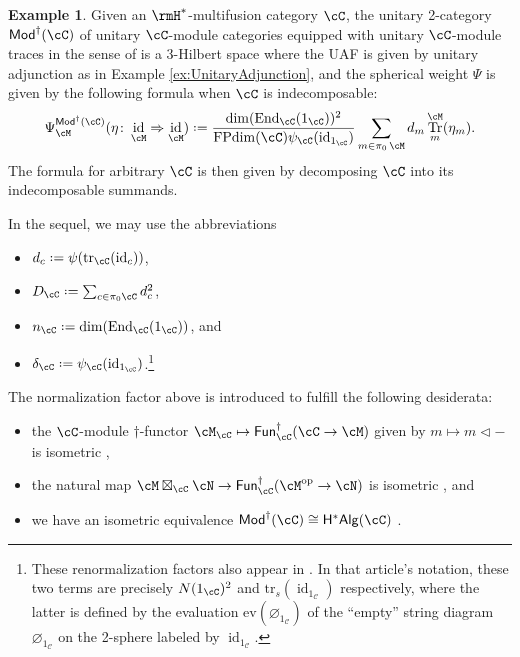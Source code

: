 \documentclass[12pt, reqno]{amsart}
\DeclareMathOperator{\End}{End}
\DeclareMathOperator{\FPdim}{FPdim}
\DeclareMathOperator{\id}{id}
\DeclareMathOperator{\Irr}{\pi_0}
\newcommand{\op}{\mathrm{op}}
\DeclareMathOperator{\Tr}{Tr}
\DeclareMathOperator{\tr}{tr}
\newcommand{\Mod}{\mathsf{Mod}}
\newcommand{\Fun}{\mathsf{Fun}}
\newcommand{\HstarAlg}{\mathsf{H^*Alg}}
\theoremstyle{plain}
\theoremstyle{definition}
\newtheorem{ex}[thm]{Example}
\newcommand{\coloneq}{:=}
\def\coloneq{\mathrel{\vcenter{\baselineskip0.55ex\lineskiplimit0pt\hbox{\upshape.}\hbox{\upshape.}}}=}
\begin{document}
\begin{ex}\label{ex:ModforH*mFC}
Given an $\rmH^*$-multifusion category $\cC$, 
the unitary 2-category
$\Mod^\dag(\cC)$ of unitary $\cC$-module categories equipped with unitary $\cC$-module traces in the sense of \cite{MR3019263,MR4598730} is a 3-Hilbert space where the UAF is given by unitary adjunction as in Example \ref{ex:UnitaryAdjunction}, and the spherical weight $\Psi$ is given 
by the following formula when $\cC$ is indecomposable:
\begin{equation}\label{modeeqn}
\Psi_{\cM}^{\Mod^\dag(\cC)}(\eta\colon \id_\cM\Rightarrow \id_\cM)
\coloneq
\frac{\dim(\End_\cC(1_\cC))^2}{\FPdim(\cC) \psi_\cC(\id_{1_\cC})}
\sum_{m\in\Irr\cM}
d_m \Tr^\cM_m(\eta_m).
\end{equation}
The formula for arbitrary $\cC$ is then given by decomposing $\cC$ into its indecomposable summands.

In the sequel, we may use the abbreviations
\begin{itemize}
\item 
$d_c\coloneq\psi(\tr_\cC(\id_c))$,
\item 
$D_\cC\coloneq \sum_{c\in\pi_0\cC} d_c^2$,
\item 
$n_\cC\coloneq\dim(\End_\cC(1_\cC))$, and
\item 
$
\delta_\cC\coloneq \psi_\cC(\id_{1_\cC})
$.\footnote{\label{footnote-notation}These renormalization factors also appear in \cite[\S2.4]{2104.02101}.
In that article's notation, these two terms are precisely $N(1_\cC)^2$ and $\mathrm{tr}_s(\id_{1_{\mathcal{C}}})$ respectively, where the latter is defined by the evaluation $\mathrm{ev}(\varnothing_{1_\mathcal{C}})$ of the ``empty'' string diagram $\varnothing_{1_\mathcal{C}}$ on the 2-sphere labeled by $\id_{1_{\mathcal{C}}}$.} 
\end{itemize}
The normalization factor above is introduced to fulfill the following desiderata:
\begin{itemize}
\item 
the $\cC$-module $\dag$-functor $\cM_\cC\mapsto \Fun^\dag_\cC(\cC\to \cM)$ given by $m\mapsto m\lhd -$ is isometric \cite[Prop.~3.9]{MR5078555},
\item 
the natural map $\cM\boxtimes_\cC \cN \to \Fun^\dag_\cC(\cM^{\op}\to \cN)$
is isometric \cite[Prop.~3.14]{MR5078555},
and
\item 
we have an isometric equivalence $\Mod^\dag(\cC)\cong \HstarAlg(\cC)$
\cite[Thm.~4.51]{MR5078555}.
\end{itemize}

\end{ex}
\end{document}
